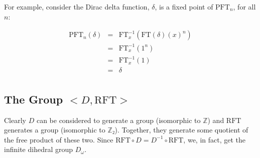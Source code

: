 \documentclass{article}
\newcommand{\RFT}{\text{RFT}}
\newcommand{\FT}{\text{FT}}
\newcommand{\PFT}{\text{PFT}}
\begin{document}
For example, consider the Dirac delta function, $\delta$,  is a fixed point of $\PFT_n$, for all $n$:

\begin{eqnarray*}
\PFT_n(δ) & = & \FT^{-1}_x( \FT(δ)(x)^n )\\
          & = & \FT^{-1}_x( 1^n         )\\
          & = & \FT^{-1}_x( 1           )\\
          & = &  δ                       \\
\end{eqnarray*}

\subsection{The Group $<D, \RFT>$}

Clearly $D$ can be considered to generate a group (isomorphic to $ℤ$) and $\RFT$ generates a group (isomorphic to $ℤ₂$). Together, they generate some quotient of the free product of these two. Since $\RFT ∘ D = D^{-1} ∘ \RFT$, we, in fact, get the infinite dihedral group $D_ω$.
\end{document}
